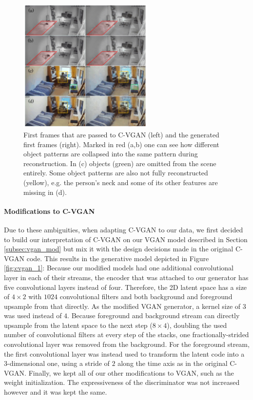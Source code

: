 \begin{figure}
	\centering
	\includegraphics[width=0.6\textwidth]{graphics/eval/cvgan_1/cvgan_1_Collapse.pdf}
  \caption[Comparison between inputs of C-VGAN and their reconstructed outputs.]{First frames that are passed to C-VGAN (left) and the generated first frames (right). Marked in red (a,b) one can see how different object patterns are collapsed into the same pattern during reconstruction. In (c) objects (green) are omitted from the scene entirely. Some object patterns are also not fully reconstructed (yellow), e.g. the person's neck and some of its other features are missing in (d).}
  \label{fig:cvgan_1_out}
\end{figure}

\paragraph{Modifications to C-VGAN}
Due to these ambiguities, when adapting C-VGAN to our data, we first decided to build our interpretation of C-VGAN on our VGAN model described in Section \ref{subsec:vgan_mod} but mix it with the design decisions made in the original C-VGAN code. This results in the generative model depicted in Figure \ref{fig:cvgan_1}: Because our modified models had one additional convolutional layer in each of their streams, the encoder that was attached to our generator has five convolutional layers instead of four. Therefore, the 2D latent space has a size of $4 \times 2$ with $1024$ convolutional filters and both background and foreground upsample from that directly. As the modified VGAN generator, a kernel size of $3$ was used instead of $4$. Because foreground and background stream can directly upsample from the latent space to the next step ($8 \times 4$), doubling the used number of convolutional filters at every step of the stacks, one fractionally-strided convolutional layer was removed from the background. For the foreground stream, the first convolutional layer was instead used to transform the latent code into a 3-dimensional one, using a stride of $2$ along the time axis as in the original C-VGAN. Finally, we kept all of our other modifications to VGAN, such as the weight initialization. The expressiveness of the discriminator was not increased however and it was kept the same.


